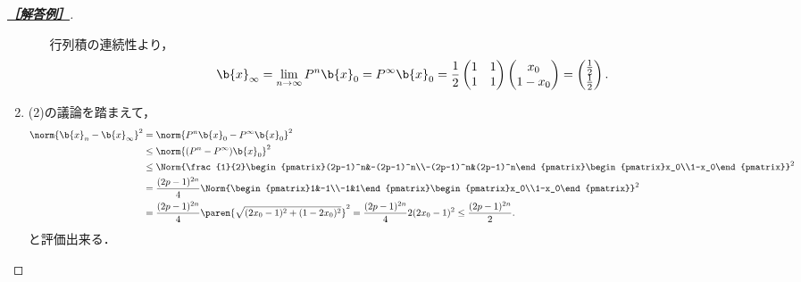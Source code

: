 \documentclass[uplatex,dvipdfmx]{jsarticle}
\begin{document}
\begin{proof}[\textbf{\underline{［解答例］}}]
\begin{enumerate}
\begin{enumerate}
            行列積の連続性より，
            \[\b{x}_\infty=\lim_{n\to\infty}P^n\b{x}_0=P^\infty\b{x}_0=\frac{1}{2}\begin{pmatrix}1&1\\1&1\end{pmatrix}\begin{pmatrix}x_0\\1-x_0\end{pmatrix}=\begin{pmatrix}\frac{1}{2}\\\frac{1}{2}\end{pmatrix}.\]
        \end{enumerate}
        \item (2)の議論を踏まえて，
        \begin{align*}
            \norm{\b{x}_n-\b{x}_\infty}^2&=\norm{P^n\b{x}_0-P^\infty\b{x}_0}^2\\
            &\le\norm{(P^n-P^\infty)\b{x}_0}^2\\
            &\le\Norm{\frac{1}{2}\begin{pmatrix}(2p-1)^n&-(2p-1)^n\\-(2p-1)^n&(2p-1)^n\end{pmatrix}\begin{pmatrix}x_0\\1-x_0\end{pmatrix}}^2\\
            &=\frac{(2p-1)^{2n}}{4}\Norm{\begin{pmatrix}1&-1\\-1&1\end{pmatrix}\begin{pmatrix}x_0\\1-x_0\end{pmatrix}}^2\\
            &=\frac{(2p-1)^{2n}}{4}\paren{\sqrt{(2x_0-1)^2+(1-2x_0)^2}}^2=\frac{(2p-1)^{2n}}{4}2(2x_0-1)^2\le\frac{(2p-1)^{2n}}{2}.
        \end{align*}
        と評価出来る．
    \end{enumerate}
\end{proof}
\end{document}
